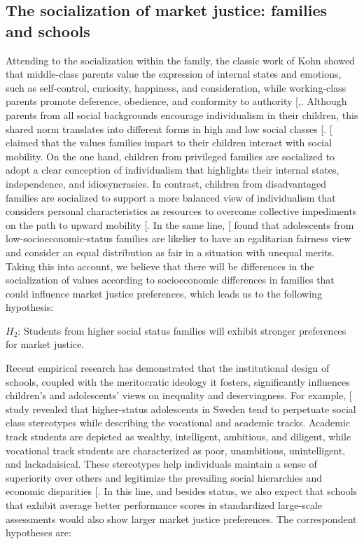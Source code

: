 \documentclass[
  12pt,
  letterpaper,
]{article}
\begin{document}
\subsection{The socialization of market justice: families and
schools}\label{the-socialization-of-market-justice-families-and-schools}

Attending to the socialization within the family, the classic work of
Kohn showed that middle-class parents value the expression of internal
states and emotions, such as self-control, curiosity, happiness, and
consideration, while working-class parents promote deference, obedience,
and conformity to authority
{[},\citeproc{ref-kohn_class_1969}{67}{]}.
Although parents from all social backgrounds encourage individualism in
their children, this shared norm translates into different forms in high
and low social classes {[}\citeproc{ref-kohn_class_1969}{67}{]}.
{[}\citeproc{ref-acemoglu_obedience_2021}{68}{]} claimed that the values
families impart to their children interact with social mobility. On the
one hand, children from privileged families are socialized to adopt a
clear conception of individualism that highlights their internal states,
independence, and idiosyncrasies. In contrast, children from
disadvantaged families are socialized to support a more balanced view of
individualism that considers personal characteristics as resources to
overcome collective impediments on the path to upward mobility
{[}\citeproc{ref-iacoviello_collectivism_2019}{69}{]}. In the same line,
{[}\citeproc{ref-almas_fairness_2017}{70}{]} found that adolescents from
low-socioeconomic-status families are likelier to have an egalitarian
fairness view and consider an equal distribution as fair in a situation
with unequal merits. Taking this into account, we believe that there
will be differences in the socialization of values according to
socioeconomic differences in families that could influence market
justice preferences, which leads us to the following hypothesis:

\(H_2\): Students from higher social status families will exhibit
stronger preferences for market justice.

Recent empirical research has demonstrated that the institutional design
of schools, coupled with the meritocratic ideology it fosters,
significantly influences children's and adolescents' views on inequality
and deservingness. For example,
{[}\citeproc{ref-jonsson_institutional_2015}{71}{]} study revealed that
higher-status adolescents in Sweden tend to perpetuate social class
stereotypes while describing the vocational and academic tracks.
Academic track students are depicted as wealthy, intelligent, ambitious,
and diligent, while vocational track students are characterized as poor,
unambitious, unintelligent, and lackadaisical. These stereotypes help
individuals maintain a sense of superiority over others and legitimize
the prevailing social hierarchies and economic disparities
{[}\citeproc{ref-jost_attitudinal_2000}{72}{]}. In this line, and
besides status, we also expect that schools that exhibit average better
performance scores in standardized large-scale assessments would also
show larger market justice preferences. The correspondent hypotheses
are:
\end{document}
